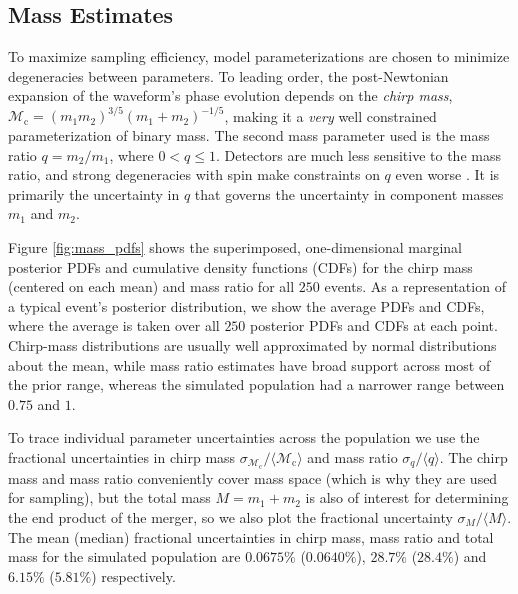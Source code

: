 \subsection{Mass Estimates}\label{sec:mass}
To maximize sampling efficiency, model parameterizations are chosen to minimize degeneracies between parameters.  To leading order, the post-Newtonian expansion of the waveform's phase evolution depends on the \emph{chirp mass}, $\mathcal{M}_\mathrm{c} = (m_1 m_2)^{3/5} (m_1 + m_2)^{-1/5}$, making it a \emph{very} well constrained parameterization of binary mass.  The second mass parameter used is the mass ratio $q = m_2/m_1$, where $0 < q \leq 1$.  Detectors are much less sensitive to the mass ratio, and strong degeneracies with spin make constraints on $q$ even worse \citep{Cutler_1994}.  It is primarily the uncertainty in $q$ that governs the uncertainty in component masses $m_1$ and $m_2$.

Figure \ref{fig:mass_pdfs} shows the superimposed, one-dimensional marginal posterior PDFs and cumulative density functions (CDFs) for the chirp mass (centered on each mean) and mass ratio for all $250$ events.  As a representation of a typical event's posterior distribution, we show the average PDFs and CDFs, where the average is taken over all $250$ posterior PDFs and CDFs at each point. Chirp-mass distributions are usually well approximated by normal distributions about the mean, while mass ratio estimates have broad support across most of the prior range, whereas the simulated population had a narrower range between $0.75$ and $1$.

To trace individual parameter uncertainties across the population we use the fractional uncertainties in chirp mass $\sigma_{\mathcal{M}_\mathrm{c}}/\langle\mathcal{M}_\mathrm{c}\rangle$ and mass ratio $\sigma_q/\langle q\rangle$. The chirp mass and mass ratio conveniently cover mass space (which is why they are used for sampling), but the total mass $M = m_1 + m_2$ is also of interest for determining the end product of the merger, so we also plot the fractional uncertainty $\sigma_M/\langle M\rangle$. The mean (median) fractional uncertainties in chirp mass, mass ratio and total mass for the simulated population are $0.0675\%$ ($0.0640\%$), $28.7\%$ ($28.4\%$) and $6.15\%$ ($5.81\%$) respectively.

